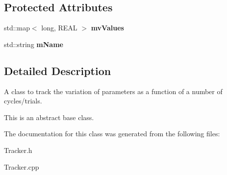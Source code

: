 \subsection*{Protected Attributes}
\begin{DoxyCompactItemize}
\item 
\mbox{\label{class_obj_cryst_1_1_tracker_adcd7db9240b7c6432a1fe2f0daec2d24}} 
std\+::map$<$ long, R\+E\+AL $>$ {\bfseries mv\+Values}
\item 
\mbox{\label{class_obj_cryst_1_1_tracker_a64fee6086f7c35c89c72d703903a1b26}} 
std\+::string {\bfseries m\+Name}
\end{DoxyCompactItemize}


\subsection{Detailed Description}
A class to track the variation of parameters as a function of a number of cycles/trials.

This is an abstract base class. 

The documentation for this class was generated from the following files\+:\begin{DoxyCompactItemize}
\item 
Tracker.\+h\item 
Tracker.\+cpp\end{DoxyCompactItemize}
